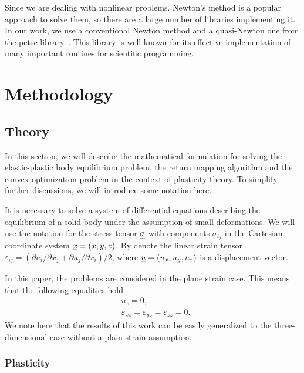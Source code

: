 \documentclass[12pt]{article}
\begin{document}
Since we are dealing with nonlinear problems. Newton's method is a popular approach to solve them, so there are a large number of libraries implementing it. In our work, we use a conventional Newton method and a quasi-Newton one from the petsc library~\parencite{petsc-user-ref}. This library is well-known for its effective implementation of many important routines for scientific programming. 

\newpage
\section{Methodology}

\subsection{Theory}

In this section, we will describe the mathematical formulation for solving the elastic-plastic body equilibrium problem, the return mapping algorithm and the convex optimization problem in the context of plasticity theory. To simplify further discussions, we will introduce some notation here. 

It is necessary to solve a system of differential equations describing the equilibrium of a solid body under the assumption of small deformations. We will use the notation for the stress tensor $\underline{\underline{\sigma}}$ with components $\sigma_{ij}$ in the Cartesian coordinate system $\underline{x} = (x, y, z)$. By denote the linear strain tensor $\varepsilon_{ij}=(\partial u_i/\partial x_j+\partial u_j/\partial x_i)/2$, where $\underline{u}=(u_x, u_y, u_z)$ is a displacement vector.

In this paper, the problems are considered in the plane strain case. This means that the following equalities hold
\begin{align*}
    & u_z = 0, \\
    & \varepsilon_{xz} = \varepsilon_{yz} = \varepsilon_{zz} = 0. 
\end{align*}
We note here that the results of this work can be easily generalized to the three-dimensional case without a plain strain assumption.

\subsubsection{Plasticity}
\end{document}
